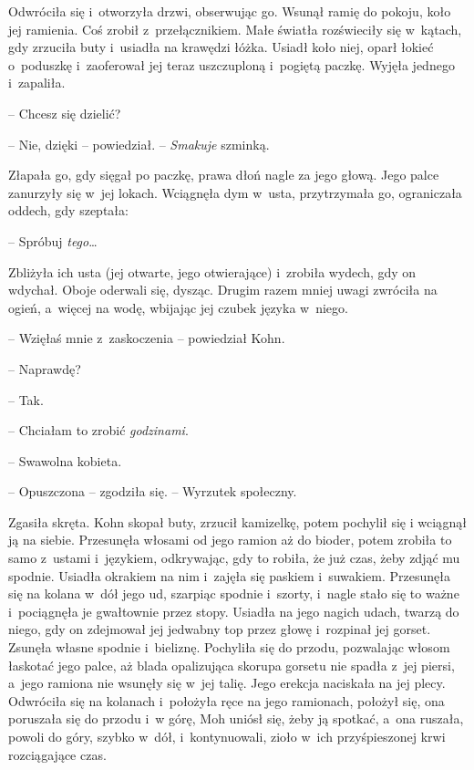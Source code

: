 \documentclass[oneside,polish,11pt,sfheadings]{mwbk}
\begin{document}
Odwróciła się i~otworzyła drzwi, obserwując go. Wsunął ramię do pokoju,
koło jej ramienia. Coś zrobił z~przełącznikiem. Małe światła rozświeciły
się w~kątach, gdy zrzuciła buty i~usiadła na krawędzi łóżka. Usiadł koło
niej, oparł łokieć o~poduszkę i~zaoferował jej teraz uszczuploną i~pogiętą paczkę. Wyjęła jednego i~zapaliła.

-- Chcesz się dzielić?

-- Nie, dzięki -- powiedział. -- \emph{Smakuje} szminką.

Złapała go, gdy sięgał po paczkę, prawa dłoń nagle za jego głową. Jego
palce zanurzyły się w~jej lokach. Wciągnęła dym w~usta, przytrzymała go,
ograniczała oddech, gdy szeptała: 

-- Spróbuj \emph{tego}\ldots

Zbliżyła ich usta (jej otwarte, jego otwierające) i~zrobiła wydech, gdy
on wdychał. Oboje oderwali się, dysząc. Drugim razem mniej uwagi
zwróciła na ogień, a~więcej na wodę, wbijając jej czubek języka w~niego.

-- Wzięłaś mnie z~zaskoczenia -- powiedział Kohn.

-- Naprawdę?

-- Tak.

-- Chciałam to zrobić \emph{godzinami}.

-- Swawolna kobieta.

-- Opuszczona -- zgodziła się. -- Wyrzutek społeczny.

Zgasiła skręta. Kohn skopał buty, zrzucił kamizelkę, potem pochylił się
i wciągnął ją na siebie. Przesunęła włosami od jego ramion aż do
bioder, potem zrobiła to samo z~ustami i~językiem, odkrywając, gdy to
robiła, że już czas, żeby zdjąć mu spodnie. Usiadła okrakiem na nim i~zajęła się paskiem i~suwakiem. Przesunęła się na kolana w~dół jego ud,
szarpiąc spodnie i~szorty, i~nagle stało się to ważne i~pociągnęła je
gwałtownie przez stopy. Usiadła na jego nagich udach, twarzą do niego,
gdy on zdejmował jej jedwabny top przez głowę i~rozpinał jej gorset.
Zsunęła własne spodnie i~bieliznę. Pochyliła się do przodu, pozwalając
włosom łaskotać jego palce, aż blada opalizująca skorupa gorsetu nie
spadła z~jej piersi, a~jego ramiona nie wsunęły się w~jej talię. Jego
erekcja naciskała na jej plecy. Odwróciła się na kolanach i~położyła
ręce na jego ramionach, położył się, ona poruszała się do przodu i~w górę, Moh uniósł się, żeby ją spotkać, a~ona ruszała, powoli do góry,
szybko w~dół, i~kontynuowali, zioło w~ich przyśpieszonej krwi
rozciągające czas.
\end{document}
